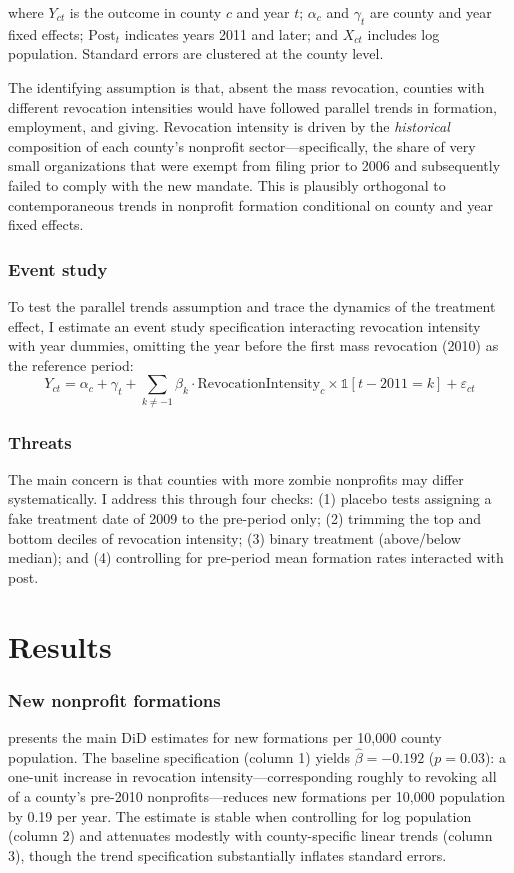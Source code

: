 \documentclass[12pt]{article}
\begin{document}
\noindent where $Y_{ct}$ is the outcome in county $c$ and year $t$; $\alpha_c$ and $\gamma_t$ are county and year fixed effects; $\text{Post}_t$ indicates years 2011 and later; and $X_{ct}$ includes log population. Standard errors are clustered at the county level.

The identifying assumption is that, absent the mass revocation, counties with different revocation intensities would have followed parallel trends in formation, employment, and giving. Revocation intensity is driven by the \emph{historical} composition of each county's nonprofit sector---specifically, the share of very small organizations that were exempt from filing prior to 2006 and subsequently failed to comply with the new mandate. This is plausibly orthogonal to contemporaneous trends in nonprofit formation conditional on county and year fixed effects.

\subsubsection*{Event study}
To test the parallel trends assumption and trace the dynamics of the treatment effect, I estimate an event study specification interacting revocation intensity with year dummies, omitting the year before the first mass revocation (2010) as the reference period:
\begin{equation}
Y_{ct} = \alpha_c + \gamma_t + \sum_{k \neq -1} \beta_k \cdot \text{RevocationIntensity}_c \times \mathbb{1}[t - 2011 = k] + \varepsilon_{ct}
\end{equation}

\subsubsection*{Threats}
The main concern is that counties with more zombie nonprofits may differ systematically. I address this through four checks: (1) placebo tests assigning a fake treatment date of 2009 to the pre-period only; (2) trimming the top and bottom deciles of revocation intensity; (3) binary treatment (above/below median); and (4) controlling for pre-period mean formation rates interacted with post.

\section{Results}

\subsubsection*{New nonprofit formations}
 presents the main DiD estimates for new formations per 10,000 county population. The baseline specification (column 1) yields $\hat{\beta} = -0.192$ ($p = 0.03$): a one-unit increase in revocation intensity---corresponding roughly to revoking all of a county's pre-2010 nonprofits---reduces new formations per 10,000 population by 0.19 per year. The estimate is stable when controlling for log population (column 2) and attenuates modestly with county-specific linear trends (column 3), though the trend specification substantially inflates standard errors.
\end{document}

